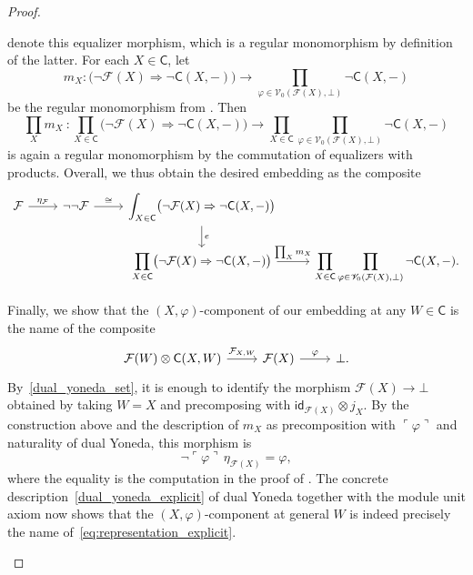 \documentclass[11pt,onecolumn]{article}
\newcommand{\id}{\mathsf{id}}
\newcommand{\cV}{\mathscr{V}}
\newcommand{\cC}{\mathsf{C}}
\newcommand{\name}[1]{\ulcorner #1 \urcorner}
\theoremstyle{plain}
\theoremstyle{remark}
\theoremstyle{definition}
\begin{document}
\begin{proof}
\begin{enumerate}
\[			\]
			denote this equalizer morphism, which is a regular monomorphism by definition of the latter.
			For each $X \in \cC$, let
			\[
				m_X \colon \bigl(\neg \mathcal{F}(X) \Rightarrow \neg \cC(X,-)\bigr)
				\longrightarrow
				\prod_{\varphi \in \cV_0(\mathcal{F}(X),\bot)} \neg \cC(X,-)
			\]
			be the regular monomorphism from .
			Then
			\[
				\prod_X m_X \: \colon \prod_{X \in \cC} \bigl(\neg \mathcal{F}(X) \Rightarrow \neg \cC(X,-)\bigr)
				\longrightarrow
				\prod_{X \in \cC} \prod_{\varphi \in \cV_0(\mathcal{F}(X),\bot)} \neg \cC(X,-)
			\]
			is again a regular monomorphism by the commutation of equalizers with products.
			Overall, we thus obtain the desired embedding as the composite
			\[
				\begin{tikzcd}
					\mathcal{F}
					\ar[r, "\eta_{\mathcal{F}}"]
					&
					\neg\neg\mathcal{F}
					\ar[r, "\cong"]
					&
					\displaystyle \int_{X \in \cC} \bigl(\neg \mathcal{F}(X) \Rightarrow \neg \cC(X,-)\bigr)
					\ar[d, "e"] \\
					& & 
					\displaystyle \prod_{X \in \cC} \bigl(\neg \mathcal{F}(X) \Rightarrow \neg \cC(X,-)\bigr)
					\ar[r, "\prod_X m_X"]
					&
					\displaystyle \prod_{X \in \cC} \prod_{\varphi \in \cV_0(\mathcal{F}(X),\bot)} \neg \cC(X,-).
				\end{tikzcd}
			\]

			Finally, we show that the $(X,\varphi)$-component of our embedding at any $W \in \cC$ is the name of the composite
			\begin{equation}
				\label{eq:representation_explicit}
				\begin{tikzcd}
					\mathcal{F}(W) \otimes \cC(X, W) \ar[r, "\mathcal{F}_{X,W}"] & \mathcal{F}(X) \ar[r, "\varphi"] & \bot.
				\end{tikzcd}
			\end{equation}
			By~\eqref{dual_yoneda_set}, it is enough to identify the morphism $\mathcal{F}(X)\to\bot$ obtained by taking $W = X$ and precomposing with $\id_{\mathcal{F}(X)} \otimes j_X$.
			By the construction above and the description of $m_X$ as precomposition with $\name{\varphi}$ and naturality of dual Yoneda, this morphism is
			\[
				\neg\name{\varphi}\,\eta_{\mathcal{F}(X)}
				=
				\varphi,
			\]
			where the equality is the computation in the proof of .
			The concrete description~\eqref{dual_yoneda_explicit} of dual Yoneda together with the module unit axiom now shows that the $(X,\varphi)$-component at general $W$ is indeed precisely the name of~\eqref{eq:representation_explicit}.
			\qedhere
	\end{enumerate}
\end{proof}
\end{document}
